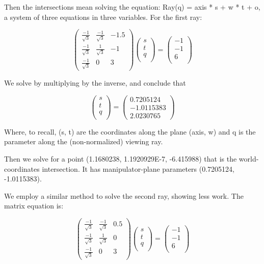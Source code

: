 \documentclass{letter}
\begin{document}
Then the intersections mean solving the equation: Ray(q) = axis * s + w * t + o, a system of three equations in three variables. For the first ray: 

$$
\begin{pmatrix}
\frac{-1}{\sqrt{3}} & \frac{-1}{\sqrt{3}} & -1.5 \\
\frac{-1}{\sqrt{3}} & \frac{1}{\sqrt{3}} & -1 \\
\frac{-1}{\sqrt{3}} & 0 & 3
\end{pmatrix}
\begin{pmatrix}
s \\
t \\
q \\
\end{pmatrix}
=
\begin{pmatrix}
-1 \\
-1 \\
6 \\
\end{pmatrix}
$$

We solve by multiplying by the inverse, and conclude that 

$$
\begin{pmatrix}
s \\
t \\
q\\
\end{pmatrix}
=
\begin{pmatrix}
0.7205124 \\ -1.0115383 \\ 2.0230765
\end{pmatrix}
$$

Where, to recall, (s, t) are the coordinates along the plane (axis, w) and q is the parameter along the (non-normalized) viewing ray. 

Then we solve for a point ({1.1680238, 1.1920929E-7, -6.415988}) that is the world-coordinates intersection. It has manipulator-plane parameters (0.7205124, -1.0115383). 

We employ a similar method to solve the second ray, showing less work. The matrix equation is:

$$
\begin{pmatrix}
\frac{-1}{\sqrt{3}} & \frac{-1}{\sqrt{3}} & 0.5 \\
\frac{-1}{\sqrt{3}} & \frac{1}{\sqrt{3}} & 0 \\
\frac{-1}{\sqrt{3}} & 0 & 3
\end{pmatrix}
\begin{pmatrix}
s \\
t \\
q \\
\end{pmatrix}
=
\begin{pmatrix}
-1 \\
-1 \\
6 \\
\end{pmatrix}
$$
\end{document}
